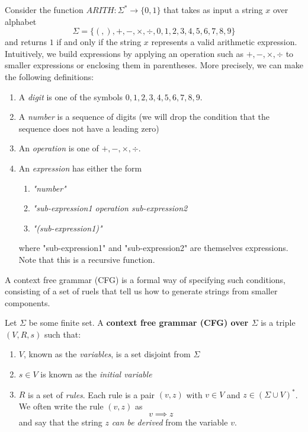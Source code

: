 \documentclass{article}
\begin{document}
  Consider the function $ARITH: \Sigma^* \longrightarrow \{0,1\}$ that takes as input a string $x$ over alphabet 
  \[\Sigma = \{(, ), +, -, \times, \div, 0, 1, 2, 3, 4, 5, 6, 7, 8, 9\}\]
  and returns $1$ if and only if the string $x$ represents a valid arithmetic expression. Intuitively, we build expressions by applying an operation such as $+, -, \times, \div$ to smaller expressions or enclosing them in parentheses. More precisely, we can make the following definitions: 
  \begin{enumerate}
      \item A \textit{digit} is one of the symbols $0, 1, 2, 3, 4, 5, 6, 7, 8, 9$. 
      \item A \textit{number} is a sequence of digits (we will drop the condition that the sequence does not have a leading zero)
      \item An \textit{operation} is one of $+, -, \times, \div$. 
      \item An \textit{expression} has either the form 
      \begin{enumerate}
          \item \textit{"number"}
          \item \textit{"sub-expression1 operation sub-expression2}
          \item \textit{"(sub-expression1)"}
      \end{enumerate}
      where "sub-expression1" and "sub-expression2" are themselves expressions. Note that this is a recursive function. 
  \end{enumerate}
  A context free grammar (CFG) is a formal way of specifying such conditions, consisting of a set of ruels that tell us how to generate strings from smaller components. 

  \begin{definition}
  Let $\Sigma$ be some finite set. A \textbf{context free grammar (CFG) over $\Sigma$} is a triple $(V, R, s)$ such that: 
  \begin{enumerate}
      \item $V$, known as the \textit{variables}, is a set disjoint from $\Sigma$
      \item $s \in V$ is known as the \textit{initial variable}
      \item $R$ is a set of \textit{rules}. Each rule is a pair $(v, z)$ with $v \in V$ and $z \in (\Sigma \cup V)^*$. We often write the rule $(v, z)$ as 
      \[v \implies z\]
      and say that the string $z$ \textit{can be derived} from the variable $v$. 
  \end{enumerate}
  \end{definition}
\end{document}
